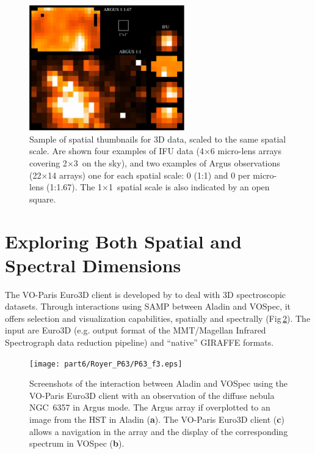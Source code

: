 \begin{figure}[!ht]
\begin{center}
    \includegraphics[width=0.6\textwidth]{part6/Royer_P63/P63_f2.eps}
\end{center}
\caption{Sample of spatial thumbnails for 3D data, scaled to the same spatial scale. Are shown four examples of IFU data (4$\times$6 micro-lens arrays covering 2\arcsec$\times$3\arcsec\ on the sky), and two examples of Argus observations (22$\times$14 arrays) one for each spatial scale:  0 (1:1) and 0 per micro-lens (1:1.67). The 1\arcsec$\times$1\arcsec\ spatial scale is also indicated by an open square.}
\label{thumbnails}
\end{figure}

\section{Exploring Both Spatial and Spectral Dimensions}
The VO-Paris Euro3D client is developed by \citet{Chn_08} to deal with 3D spectroscopic datasets. Through interactions using SAMP between Aladin
 and VOSpec,
it offers selection and visualization capabilities, spatially and spectrally (Fig\,\ref{aladin}). The input are Euro3D (e.g.  output format of the MMT/Magellan Infrared Spectrograph data reduction pipeline) and ``native'' GIRAFFE formats. 
\begin{figure}[!ht]
\begin{center}
    \texttt{[image: part6/Royer\_P63/P63\_f3.eps]}
\end{center}
\caption{Screenshots of the interaction between Aladin and VOSpec using the VO-Paris Euro3D client \citep{Chn_08} with an observation of the diffuse nebula NGC~6357 in Argus mode. The Argus array if overplotted to an image from the HST in Aladin (\textbf{a}). The VO-Paris Euro3D client (\textbf{c}) allows a navigation in the array and the display of the corresponding spectrum in VOSpec (\textbf{b}).}
\label{aladin}
\end{figure}





